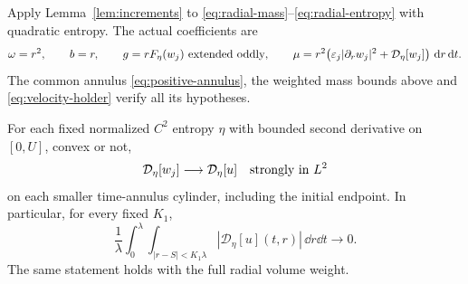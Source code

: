 Apply Lemma~\ref{lem:increments} to \eqref{eq:radial-mass}--\eqref{eq:radial-entropy}
with quadratic entropy. The actual coefficients are
\[
 \omega=r^2,\qquad b=r,\qquad
 g=rF_\eta(w_j)\ \hbox{extended oddly},\qquad
 \mu=r^2\bigl(\varepsilon_j|\partial_rw_j|^2+\mathcal D_\eta[w_j]\bigr)\,\,\mathrm d r\,\mathrm d t.
\]
The common annulus \eqref{eq:positive-annulus}, the weighted mass bounds
above and \eqref{eq:velocity-holder} verify all its hypotheses.

\begin{lemma}\label{lem:defect-convergence}
For each fixed normalized $C^2$ entropy $\eta$ with bounded second
derivative on $[0,U]$, convex or not,
\[
 \mathcal D_\eta[w_j]\longrightarrow\mathcal D_\eta[u]
 \quad\hbox{strongly in }L^2
\]
on each smaller time-annulus cylinder, including the initial endpoint.
In particular, for every fixed $K_1$,
\begin{equation}\label{eq:tube-defect}
 \frac1\lambda\int_0^\lambda
 \int_{|r-S|<K_1\lambda}|\mathcal D_\eta[u](t,r)|\,\dd r\dd t
 \longrightarrow0.
\end{equation}
The same statement holds with the full radial volume weight.
\end{lemma}

